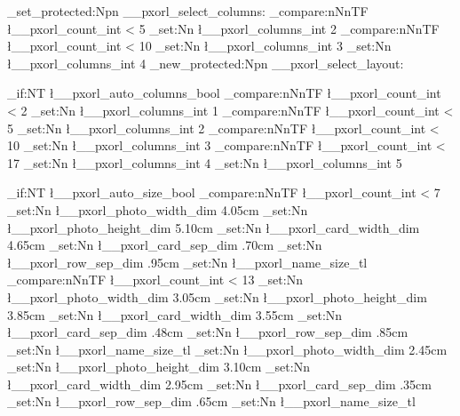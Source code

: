\cs_set_protected:Npn \__pxorl_select_columns:
{
	\int_compare:nNnTF { \l__pxorl_count_int } < { 5 }
	{ \int_set:Nn \l__pxorl_columns_int { 2 } }
	{
		\int_compare:nNnTF { \l__pxorl_count_int } < { 10 }
		{ \int_set:Nn \l__pxorl_columns_int { 3 } }
		{ \int_set:Nn \l__pxorl_columns_int { 4 } }
	}
}
\cs_new_protected:Npn \__pxorl_select_layout:
{
	\bool_if:NT \l__pxorl_auto_columns_bool
	{
		\int_compare:nNnTF { \l__pxorl_count_int } < { 2 }
		{ \int_set:Nn \l__pxorl_columns_int { 1 } }
		{
			\int_compare:nNnTF { \l__pxorl_count_int } < { 5 }
			{ \int_set:Nn \l__pxorl_columns_int { 2 } }
			{
				\int_compare:nNnTF { \l__pxorl_count_int } < { 10 }
				{ \int_set:Nn \l__pxorl_columns_int { 3 } }
				{
					\int_compare:nNnTF { \l__pxorl_count_int } < { 17 }
					{ \int_set:Nn \l__pxorl_columns_int { 4 } }
					{ \int_set:Nn \l__pxorl_columns_int { 5 } }
				}
			}
		}
	}

	\bool_if:NT \l__pxorl_auto_size_bool
	{
		\int_compare:nNnTF { \l__pxorl_count_int } < { 7 }
		{
			\dim_set:Nn \l__pxorl_photo_width_dim  { 4.05cm }
			\dim_set:Nn \l__pxorl_photo_height_dim { 5.10cm }
			\dim_set:Nn \l__pxorl_card_width_dim   { 4.65cm }
			\dim_set:Nn \l__pxorl_card_sep_dim     { .70cm }
			\dim_set:Nn \l__pxorl_row_sep_dim      { .95cm }
			\tl_set:Nn  \l__pxorl_name_size_tl     { \normalsize }
		}
		{
			\int_compare:nNnTF { \l__pxorl_count_int } < { 13 }
			{
				\dim_set:Nn \l__pxorl_photo_width_dim  { 3.05cm }
				\dim_set:Nn \l__pxorl_photo_height_dim { 3.85cm }
				\dim_set:Nn \l__pxorl_card_width_dim   { 3.55cm }
				\dim_set:Nn \l__pxorl_card_sep_dim     { .48cm }
				\dim_set:Nn \l__pxorl_row_sep_dim      { .85cm }
				\tl_set:Nn  \l__pxorl_name_size_tl     { \small }
			}
			{
				\dim_set:Nn \l__pxorl_photo_width_dim  { 2.45cm }
				\dim_set:Nn \l__pxorl_photo_height_dim { 3.10cm }
				\dim_set:Nn \l__pxorl_card_width_dim   { 2.95cm }
				\dim_set:Nn \l__pxorl_card_sep_dim     { .35cm }
				\dim_set:Nn \l__pxorl_row_sep_dim      { .65cm }
				\tl_set:Nn  \l__pxorl_name_size_tl     { \scriptsize }
			}
		}
	}
}

